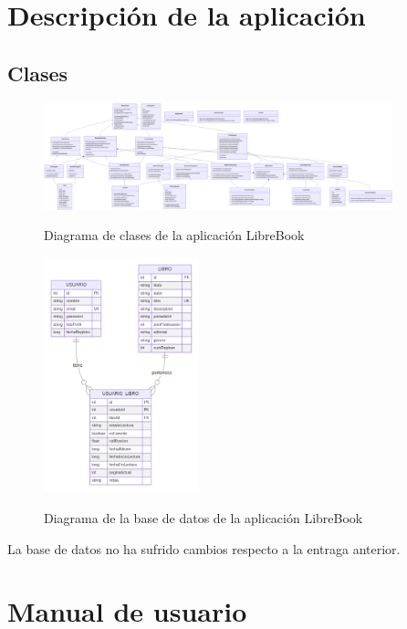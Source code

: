 \documentclass[a4paper,12pt]{report}
\begin{document}
  \chapter{Descripción de la aplicación}
    \section{Clases}
      \begin{figure}[H]
        \centering
        \href{https://raw.githubusercontent.com/Xabierland/DAS-Proyecto/refs/heads/main/Documentation/Memoria2/.img/diagrama-clases.svg}{%
          \includegraphics[width=0.9\textwidth]{.img/diagrama-clases.png}
        }
        \caption{Diagrama de clases de la aplicación LibreBook}
        \label{fig:diagrama-clases}
      \end{figure}
      \begin{figure}[H]
        \centering
        \href{https://raw.githubusercontent.com/Xabierland/DAS-Proyecto/refs/heads/main/Documentation/Memoria2/.img/diagrama-bd.svg}{%
          \includegraphics[width=0.4\textwidth]{.img/diagrama-bd.png}
        }
        \caption{Diagrama de la base de datos de la aplicación LibreBook}
        \label{fig:diagrama-bd}
      \end{figure}
      La base de datos no ha sufrido cambios respecto a la entraga anterior.
  \chapter{Manual de usuario}
\end{document}
